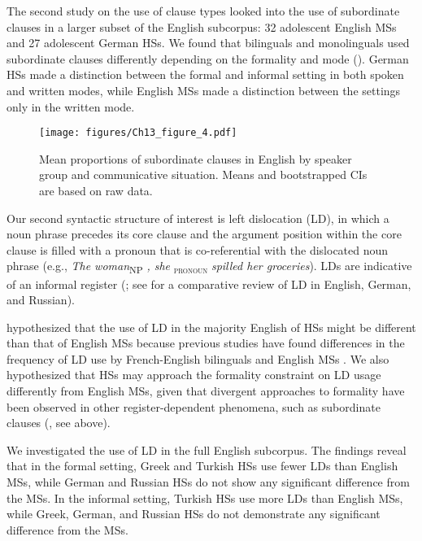 \documentclass[output=paper,colorlinks,citecolor=brown]{langscibook}
\begin{document}
The second study on the use of clause types \parencite{tsehaye2021} looked into the use of subordinate clauses in a larger subset of the English subcorpus: 32 adolescent English MSs and 27 adolescent German HSs. We found that bilinguals and monolinguals used subordinate clauses differently depending on the formality and mode (). German HSs made a distinction between the formal and informal setting in both spoken and written modes, while English MSs made a distinction between the settings only in the written mode.

\begin{figure}
    \texttt{[image: figures/Ch13\_figure\_4.pdf]}
    \caption{Mean proportions of subordinate clauses in English by speaker group and communicative situation. Means and bootstrapped CIs are based on raw data.}
    \label{fig:pashkovaetal:4}
\end{figure}

Our second syntactic structure of interest is left dislocation (LD), in which a noun phrase precedes its core clause and the argument position within the core clause is filled with a pronoun that is co-referential with the dislocated noun phrase (e.g., \textit{The woman}{\textsc{\textsubscript{NP}}} \textit{, she} \textsc{\textsubscript{pronoun}} {\textit{spilled her groceries}}). LDs are indicative of an informal register (\cite{keenan1977, Geluykens1992}; see \cite{chapters/11} for a comparative review of LD in English, German, and Russian).

\citet{pashkovainprep_d} hypothesized that the use of LD in the majority English of HSs might be different than that of English MSs because previous studies have found differences in the frequency of LD use by French-English bilinguals and English MSs \parencite{hervé2016, Tagliamonte2019}. We also hypothesized that HSs may approach the formality constraint on LD usage differently from English MSs, given that divergent approaches to formality have been observed in other register-dependent phenomena, such as subordinate clauses (\cite{tsehaye2021}, see above).

We investigated the use of LD in the full English subcorpus. The findings reveal that in the formal setting, Greek and Turkish HSs use fewer LDs than English MSs, while German and Russian HSs do not show any significant difference from the MSs. In the informal setting, Turkish HSs use more LDs than English MSs, while Greek, German, and Russian HSs do not demonstrate any significant difference from the MSs.
\end{document}
